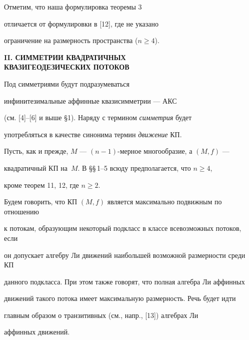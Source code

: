 Отметим, что наша формулировка теоремы 3


отличается от формулировки в [12], где не указано


ограничение на размерность пространства ($n\geq 4$).


\medskip





\begin{center}


{\bf II. СИММЕТРИИ КВАДРАТИЧНЫХ \\


\bf КВАЗИГЕОДЕЗИЧЕСКИХ ПОТОКОВ}


\end{center}


\medskip








Под симметриями будут подразумеваться


инфинитезимальные аффинные квазисимметрии --- АКС


(см. [4]--[6] и выше \S 1). Наряду с термином {\it симметрия} будет


употребляться в качестве синонима термин {\it движение} КП.





Пусть, как и прежде, $M$ --- $(n-1)$-мерное многообразие, а $(M,f) $ ---


квадратичный КП на~$M$. В \S\S\,1--5 всюду предполагается, что $n\geq 4$,


кроме теорем 11, 12, где $n\geq 2$.





Будем говорить, что КП $(M,f) $ является максимально подвижным по отношению


к потокам, образующим некоторый подкласс в классе всевозможных потоков, если


он допускает алгебру Ли движений наибольшей возможной размерности среди КП


данного подкласса. При этом также говорят, что полная алгебра Ли аффинных


движений такого потока имеет максимальную размерность. Речь будет идти


главным образом о транзитивных (см., напр., [13]) алгебрах Ли


аффинных движений.


\medskip





